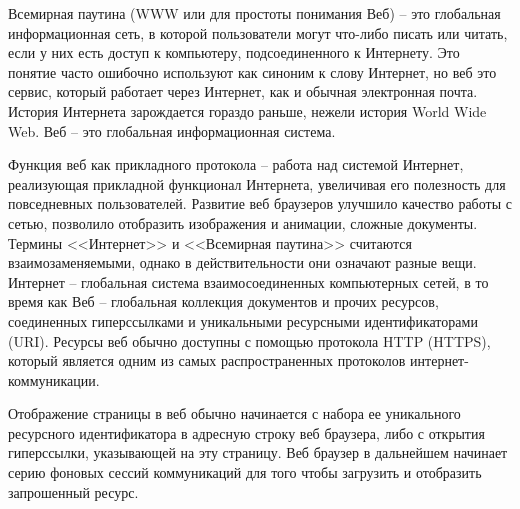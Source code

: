 Всемирная паутина (WWW или для простоты понимания Веб) -- это глобальная информационная сеть, в которой пользователи могут что-либо писать или читать, если у них есть доступ к компьютеру, подсоединенного к Интернету.
Это понятие часто ошибочно используют как синоним к слову Интернет, но веб это сервис, который работает через Интернет, как и обычная электронная почта. История Интернета зарождается гораздо раньше, нежели история World Wide Web.
Веб -- это глобальная информационная система.

Функция веб как прикладного протокола -- работа над системой Интернет, реализующая прикладной функционал Интернета, увеличивая его полезность для повседневных пользователей.
Развитие веб браузеров улучшило качество работы с сетью, позволило отобразить изображения и анимации, сложные документы. Термины <<Интернет>> и <<Всемирная паутина>> считаются взаимозаменяемыми, однако
в действительности они означают разные вещи. Интернет -- глобальная система взаимосоединенных компьютерных сетей, в то время как Веб -- глобальная коллекция документов и прочих ресурсов, соединенных гиперссылками и
уникальными ресурсными идентификаторами (URI). Ресурсы веб обычно доступны с помощью протокола HTTP (HTTPS), который является одним из самых распространенных протоколов интернет-коммуникации. \cite{web_internet}

Отображение страницы в веб обычно начинается с набора ее уникального ресурсного идентификатора в адресную строку веб браузера, либо с открытия гиперссылки, указывающей на эту страницу.
Веб браузер в дальнейшем начинает серию фоновых сессий коммуникаций для того чтобы загрузить и отобразить запрошенный ресурс.

